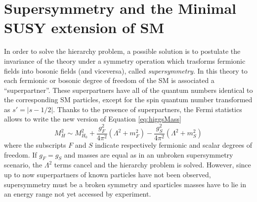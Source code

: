 
\section{Supersymmetry and the Minimal SUSY extension of SM}\label{sect:susy}
In order to solve the hierarchy problem, a possible solution is to postulate the invariance of the theory under a symmetry operation which trasforms fermionic fields into bosonic fields (and viceversa), called \textit{supersymmetry}. In this theory to each fermionic or bosonic
degree of freedom of the SM is associated a ``superpartner''. These superpartners have all of the quantum numbers identical to the corresponding SM particles, except for the spin quantum number transformed as $s' = |s - 1/2|$. Thanks to the presence of superpartners, the Fermi statistics allows to write the new version of Equation \ref{eq:higgsMass} \cite{dawson-1997}
\begin{equation}
\label{eq:higgsMassSUSY}
M_{H}^{2} \sim M_{H_{0}}^{2} + \dfrac{g_{F}^{2}}{4\pi^{2}} (\Lambda^{2} + m_{F}^{2} ) - \dfrac{g_{S}^{2}}{4\pi^{2}} (\Lambda^{2} + m_{S}^{2} ) 
\end{equation} 
where the subscripts $F$ and $S$ indicate respectively fermionic and scalar degrees of freedom. If $g_{F} = g_{S}$ and masses are equal as in an unbroken supersymmetry scenario, the $\Lambda^2$ terms cancel and the hierarchy problem is solved. However, since up to now superpartners of known particles have not been observed,  supersymmetry must be a broken symmetry and sparticles masses have to lie in an energy range not yet accessed by experiment.

